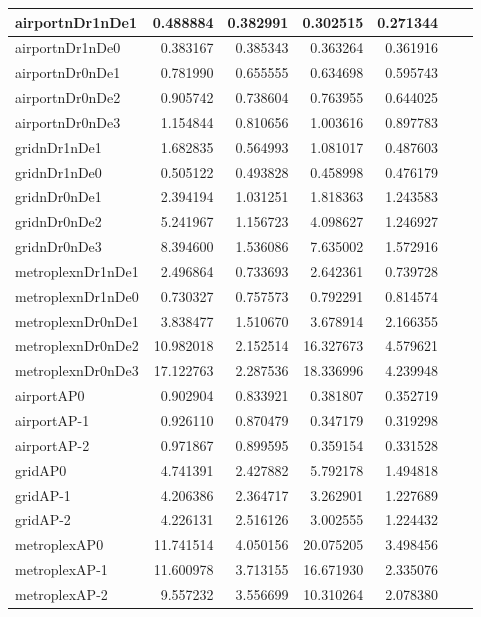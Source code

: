 \begin{longtable}{|l|r|r|r|r|r|r|}
\endlastfoot
airportnDr1nDe1 & 0.488884 & 0.382991 & 0.302515 & 0.271344 \\ \hline
airportnDr1nDe0 & 0.383167 & 0.385343 & 0.363264 & 0.361916 \\ \hline
airportnDr0nDe1 & 0.781990 & 0.655555 & 0.634698 & 0.595743 \\ \hline
airportnDr0nDe2 & 0.905742 & 0.738604 & 0.763955 & 0.644025 \\ \hline
airportnDr0nDe3 & 1.154844 & 0.810656 & 1.003616 & 0.897783 \\ \hline
gridnDr1nDe1 & 1.682835 & 0.564993 & 1.081017 & 0.487603 \\ \hline
gridnDr1nDe0 & 0.505122 & 0.493828 & 0.458998 & 0.476179 \\ \hline
gridnDr0nDe1 & 2.394194 & 1.031251 & 1.818363 & 1.243583 \\ \hline
gridnDr0nDe2 & 5.241967 & 1.156723 & 4.098627 & 1.246927 \\ \hline
gridnDr0nDe3 & 8.394600 & 1.536086 & 7.635002 & 1.572916 \\ \hline
metroplexnDr1nDe1 & 2.496864 & 0.733693 & 2.642361 & 0.739728 \\ \hline
metroplexnDr1nDe0 & 0.730327 & 0.757573 & 0.792291 & 0.814574 \\ \hline
metroplexnDr0nDe1 & 3.838477 & 1.510670 & 3.678914 & 2.166355 \\ \hline
metroplexnDr0nDe2 & 10.982018 & 2.152514 & 16.327673 & 4.579621 \\ \hline
metroplexnDr0nDe3 & 17.122763 & 2.287536 & 18.336996 & 4.239948 \\ \hline
airportAP0 & 0.902904 & 0.833921 & 0.381807 & 0.352719 \\ \hline
airportAP-1 & 0.926110 & 0.870479 & 0.347179 & 0.319298 \\ \hline
airportAP-2 & 0.971867 & 0.899595 & 0.359154 & 0.331528 \\ \hline
gridAP0 & 4.741391 & 2.427882 & 5.792178 & 1.494818 \\ \hline
gridAP-1 & 4.206386 & 2.364717 & 3.262901 & 1.227689 \\ \hline
gridAP-2 & 4.226131 & 2.516126 & 3.002555 & 1.224432 \\ \hline
metroplexAP0 & 11.741514 & 4.050156 & 20.075205 & 3.498456 \\ \hline
metroplexAP-1 & 11.600978 & 3.713155 & 16.671930 & 2.335076 \\ \hline
metroplexAP-2 & 9.557232 & 3.556699 & 10.310264 & 2.078380 \\ \hline

\end{longtable}
